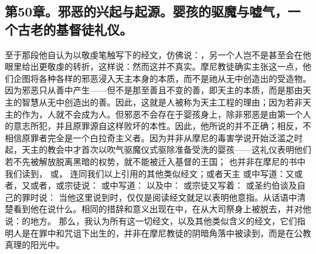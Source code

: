 
\subsection{第50章。邪恶的兴起与起源。婴孩的驱魔与嘘气，一个古老的基督徒礼仪。}

至于那段他自认为以敬虔笔触写下的经文，仿佛说：，另一个人岂不是甚至会在他眼里给出更敬虔的转折，这样说：然而这并不真实。摩尼教徒确实主张这一点，他们企图将各种各样的邪恶浸入天主本身的本质，而不是祂从无中创造出的受造物。因为邪恶只从善中产生——但不是那至善且不变的善，即天主的本质，而是那由天主的智慧从无中创造出的善。因此，这就是人被称为天主工程的理由；因为若非天主的作为，人就不会成为人。但邪恶不会存在于婴孩身上，除非邪恶是由第一个人的意志所犯，并且原罪源自这样败坏的本性。因此，他所说的并不正确；相反，不相信原罪者完全是一个白拉奇主义者。因为并非从摩尼的毒害学说开始泛滥之时起，天主的教会中才首次以吹气驱魔仪式驱除准备受洗的婴孩——这礼仪表明他们若不先被解放脱离黑暗的权势，就不能被迁入基督的王国； 也并非在摩尼的书中我们读到， 或， 连同我们以上引用的其他类似经文；或者天主 或中写道：又或者，又或者，或宗徒说： 或中写道： 以及中： 或宗徒又写着： 或圣约伯谈及自己的罪时说： 当他这里说到时，仅仅是阅读经文就足以表明他意指。从话语中清楚看到他在说什么。相同的措辞和意义出现在中，在从大司祭身上被脱去，并对他说：的地方。 那么，我认为所有这一切经文，以及其他类似含义的经文，它们指明人是在罪中和咒诅下出生的，并非在摩尼教徒的阴暗角落中被读到，而是在公教真理的阳光中。\par

